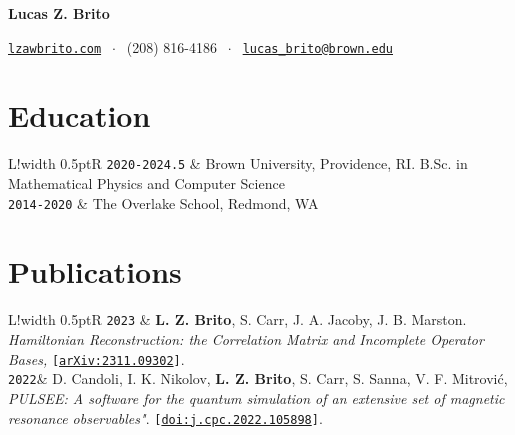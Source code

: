 \documentclass{article}
\newcommand\VRule{\color{white}\vrule width 0.5pt}
\begin{document}
\begin{minipage}{2in}
    \LARGE{\textbf{\textsf{Lucas Z. Brito}}}
\end{minipage}
\hfill
\begin{minipage}{4.2in}
    \medskip
    \raggedleft
    \href{https://www.lzawbrito.com/cv}{\texttt{lzawbrito.com}}
    $ \;\cdot\; $
    (208) 816-4186 $ \; \cdot \; $  
    \href{mailto:lucas_brito@brown.edu}{\texttt{lucas\_brito@brown.edu}}\\
\end{minipage}

\bigskip

\section*{Education}
\begin{tabular}{L!{\VRule}R}
    \texttt{2020-2024.5} & Brown University, Providence, RI. B.Sc. in  Mathematical
        Physics and Computer Science \\
\texttt{2014-2020} & The Overlake School, Redmond, WA
\end{tabular}

\section*{Publications}
\begin{tabular}{L!{\VRule}R}
\texttt{2023} & \textbf{L. Z. Brito}, S. Carr, J. A. Jacoby, J. B. Marston. 
\textit{Hamiltonian Reconstruction: the Correlation Matrix and Incomplete Operator Bases,} 
\texttt{[}\href{https://arxiv.org/abs/2311.09302}{\texttt{arXiv:2311.09302}}\texttt{]}.\\
\texttt{2022}& D. Candoli, I. K. Nikolov, \textbf{L. Z.  Brito}, S. Carr, S.
Sanna, V. F. Mitrović, \textit{PULSEE: A software for the quantum simulation of
an extensive set of magnetic resonance observables"}.
\texttt{[}\href{https://doi.org/10.1016/j.cpc.2022.108598}{\texttt{doi:j.cpc.2022.105898}}\texttt{]}.
\end{tabular}
\end{document}
